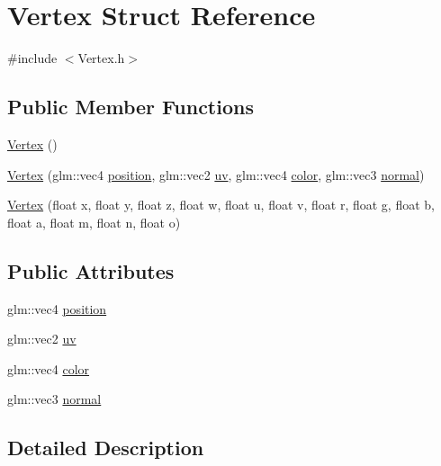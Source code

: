 \hypertarget{struct_vertex}{}\section{Vertex Struct Reference}
\label{struct_vertex}


{\ttfamily \#include $<$Vertex.\+h$>$}

\subsection*{Public Member Functions}
\begin{DoxyCompactItemize}
\item 
\hyperlink{struct_vertex_a97488994a2482d70da74e1b91d40e169}{Vertex} ()
\item 
\hyperlink{struct_vertex_a30e022efb3a5d01ab1e1451ca871264e}{Vertex} (glm\+::vec4 \hyperlink{struct_vertex_a6814af2586248942604e8edd28d950a9}{position}, glm\+::vec2 \hyperlink{struct_vertex_a8d5cc8548016889746f251d98377ec8a}{uv}, glm\+::vec4 \hyperlink{struct_vertex_aa7ecd21578677765699b8831e0011696}{color}, glm\+::vec3 \hyperlink{struct_vertex_a3aa35fe84025ecf1acccb5f65f5577fd}{normal})
\item 
\hyperlink{struct_vertex_a2947e9185be83a2142f5676ed101d727}{Vertex} (float x, float y, float z, float w, float u, float v, float r, float g, float b, float a, float m, float n, float o)
\end{DoxyCompactItemize}
\subsection*{Public Attributes}
\begin{DoxyCompactItemize}
\item 
glm\+::vec4 \hyperlink{struct_vertex_a6814af2586248942604e8edd28d950a9}{position}
\item 
glm\+::vec2 \hyperlink{struct_vertex_a8d5cc8548016889746f251d98377ec8a}{uv}
\item 
glm\+::vec4 \hyperlink{struct_vertex_aa7ecd21578677765699b8831e0011696}{color}
\item 
glm\+::vec3 \hyperlink{struct_vertex_a3aa35fe84025ecf1acccb5f65f5577fd}{normal}
\end{DoxyCompactItemize}


\subsection{Detailed Description}


